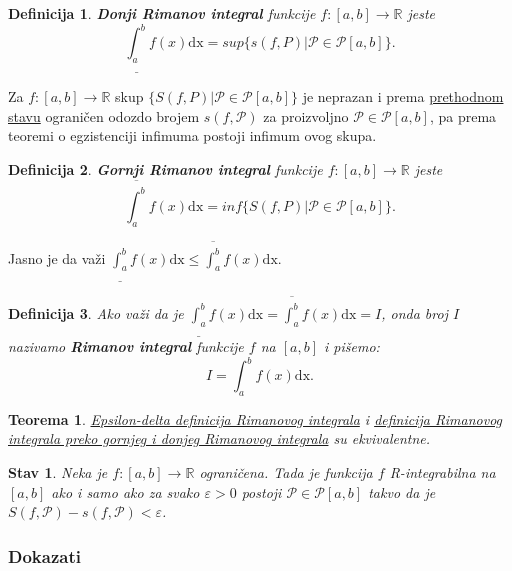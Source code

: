 \documentclass{article}
\newtheorem{definicija}{Definicija}[section]
\newtheorem{teorema}{Teorema}[section]
\newtheorem{stav}{Stav}[section]
\begin{document}
\begin{defbox}
    \begin{definicija}
        \textbf{Donji Rimanov integral} funkcije $f: [a,b]\longrightarrow\mathbb{R}$ jeste
        $$\underline{\int_{a}^{b}}f(x)\text{dx}=sup\{s(f,P)\big|\mathcal{P}\in\mathcal{P}[a,b]\}.$$
    \end{definicija}
\end{defbox}
Za $f: [a,b]\longrightarrow\mathbb{R}$ skup $\{S(f,P)\big|\mathcal{P}\in\mathcal{P}[a,b]\}$
je neprazan i prema \hyperref[stav_2.2]{prethodnom stavu} ograničen odozdo brojem $s(f,\mathcal{P})$ za proizvoljno $\mathcal{P}\in\mathcal{P}[a,b]$,
pa prema teoremi o egzistenciji infimuma postoji infimum ovog
skupa.

\begin{defbox}
    \begin{definicija}
        \textbf{Gornji Rimanov integral} funkcije $f: [a,b]\longrightarrow\mathbb{R}$ jeste
        $$\overline{\int_{a}^{b}}f(x)\text{dx}=inf\{S(f,P)\big|\mathcal{P}\in\mathcal{P}[a,b]\}.$$
    \end{definicija}
\end{defbox}

Jasno je da važi $\displaystyle\underline{\int_{a}^{b}}f(x)\text{dx}\leq\overline{\int_{a}^{b}}f(x)\text{dx}$.

\begin{defbox}
    \label{definicija_2.8}
    \begin{definicija}
        Ako važi da je $\displaystyle\underline{\int_{a}^{b}}f(x)\text{dx}=\overline{\int_{a}^{b}}f(x)\text{dx}=I$,
        onda broj $I$ nazivamo \textbf{Rimanov integral} funkcije $f$ na $[a,b]$ i pišemo:
        $$I=\int_{a}^{b}f(x)\text{dx}.$$
    \end{definicija}
\end{defbox}

\begin{teoremabox}
    \begin{teorema}
        \hyperref[definicija_2.3]{Epsilon-delta definicija Rimanovog integrala} i \hyperref[definicija_2.8]{definicija Rimanovog integrala preko gornjeg i donjeg Rimanovog integrala}
        su ekvivalentne.
    \end{teorema}
\end{teoremabox}
\begin{stavbox}
    \label{Stav_2.3}
    \begin{stav}
        Neka je $f: [a,b]\longrightarrow\mathbb{R}$ ograničena. Tada je funkcija $f$
        R-integrabilna na $[a,b]$ ako i samo ako za svako $\varepsilon>0$ postoji
        $\mathcal{P}\in\mathcal{P}[a,b]$ takvo da je $S(f,\mathcal{P})-s(f,\mathcal{P})<\varepsilon$.
    \end{stav}
    \subsubsection{Dokazati}
\end{stavbox}
\end{document}
